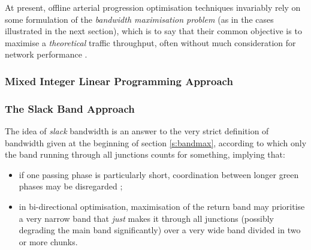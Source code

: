 At present, offline arterial progression optimisation techniques invariably rely on some formulation of the \emph{bandwidth maximisation problem} (as in the cases illustrated in the next section), which is to say that their common objective is to maximise a \emph{theoretical} traffic throughput, often without much consideration for network performance .



\subsubsection*{Mixed Integer Linear Programming Approach}

\subsubsection{The Slack Band Approach} \label{s:slackband}
The idea of \emph{slack} bandwidth is an answer to the very strict definition of bandwidth given at the beginning of section \ref{s:bandmax}, according to which only the band running through all junctions counts for something, implying that:
\begin{itemize}
\item if one passing phase is particularly short, coordination between longer green phases may be disregarded ;
\item in bi-directional optimisation, maximisation of the return band may prioritise a very narrow band that \emph{just} makes it through all junctions (possibly degrading the main band significantly) over a very wide band divided in two or more chunks.
\end{itemize} 
